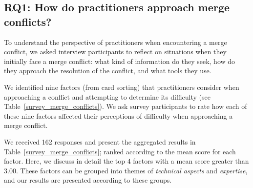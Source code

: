 \subsection{\textbf{RQ1:} How do practitioners approach merge conflicts?}\label{RQ1}
To understand the perspective of practitioners when encountering a merge conflict, we asked interview participants to reflect on situations when they initially face a merge conflict: what kind of information do they seek, how do they approach the resolution of the conflict, and what tools they use. 

We identified nine factors (from card sorting) that practitioners consider when approaching a conflict and attempting to determine its difficulty (see Table~\ref{survey_merge_conflicts}). 
We ask survey participants to rate how each of these nine factors affected their perceptions of difficulty when approaching a merge conflict.


We received 162 responses and present the aggregated results in Table~\ref{survey_merge_conflicts}; ranked according to the mean score for each factor.
Here, we discuss in detail the top 4 factors with a mean score greater than $3.00$.
These factors can be grouped into themes of \textit{technical aspects} and \textit{expertise}, and our results are presented according to these groups.

